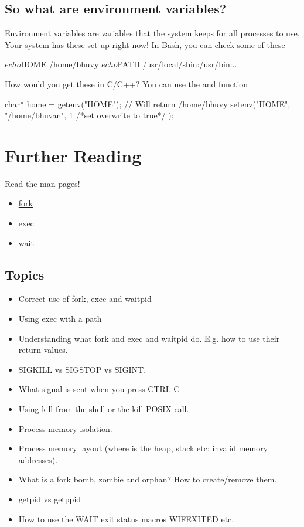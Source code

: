 \subsection{So what are environment variables?}\label{so-what-are-environment-variables}

Environment variables are variables that the system keeps for all processes to use. Your system has these set up right now! In Bash, you can check some of these

\begin{code}[language=C]
$ echo $HOME
/home/bhuvy
$ echo $PATH
/usr/local/sbin:/usr/bin:...
\end{code}

How would you get these in C/C++? You can use the  and  function

\begin{code}[language=C]
char* home = getenv("HOME"); // Will return /home/bhuvy
setenv("HOME", "/home/bhuvan", 1 /*set overwrite to true*/ );
\end{code}

\section{Further Reading}\label{how-can-i-find-out-more}

Read the man pages! 
\begin{itemize}
\item \href{http://man7.org/linux/man-pages/man2/fork.2.html}{fork} 
\item \href{http://man7.org/linux/man-pages/man3/exec.3.html}{exec} 
\item \href{http://man7.org/linux/man-pages/man2/wait.2.html}{wait}
\end{itemize}

\subsection{Topics}\label{topics}

\begin{itemize}
\tightlist
\item
  Correct use of fork, exec and waitpid
\item
  Using exec with a path
\item
  Understanding what fork and exec and waitpid do. E.g. how to use their return values.
\item
  SIGKILL vs SIGSTOP vs SIGINT.
\item
  What signal is sent when you press CTRL-C
\item
  Using kill from the shell or the kill POSIX call.
\item
  Process memory isolation.
\item
  Process memory layout (where is the heap, stack etc; invalid memory addresses).
\item
  What is a fork bomb, zombie and orphan? How to create/remove them.
\item
  getpid vs getppid
\item
  How to use the WAIT exit status macros WIFEXITED etc.
\end{itemize}

